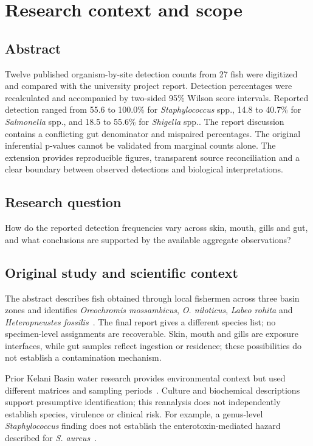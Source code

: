 \documentclass[11pt,a4paper]{article}
\newcommand{\organism}[1]{\textit{#1} spp.}
\newcommand{\sectiontitle}[1]{\section{\color{ink}#1}}
\begin{document}
\sectiontitle{Research context and scope}
\subsection*{Abstract}
Twelve published organism-by-site detection counts from 27 fish were digitized and compared with the university project report. Detection percentages were recalculated and accompanied by two-sided 95\% Wilson score intervals. Reported detection ranged from 55.6 to 100.0\% for \organism{Staphylococcus}, 14.8 to 40.7\% for \organism{Salmonella}, and 18.5 to 55.6\% for \organism{Shigella}. The report discussion contains a conflicting gut denominator and mispaired percentages. The original inferential p-values cannot be validated from marginal counts alone. The extension provides reproducible figures, transparent source reconciliation and a clear boundary between observed detections and biological interpretations.

\subsection*{Research question}
How do the reported detection frequencies vary across skin, mouth, gills and gut, and what conclusions are supported by the available aggregate observations?

\subsection*{Original study and scientific context}
The abstract describes fish obtained through local fishermen across three basin zones and identifies \textit{Oreochromis mossambicus}, \textit{O. niloticus}, \textit{Labeo rohita} and \textit{Heteropneustes fossilis}~\cite{abstract}. The final report gives a different species list; no specimen-level assignments are recoverable. Skin, mouth and gills are exposure interfaces, while gut samples reflect ingestion or residence; these possibilities do not establish a contamination mechanism.

Prior Kelani Basin water research provides environmental context but used different matrices and sampling periods~\cite{kelani}. Culture and biochemical descriptions support presumptive identification; this reanalysis does not independently establish species, virulence or clinical risk. For example, a genus-level \textit{Staphylococcus} finding does not establish the enterotoxin-mediated hazard described for \textit{S. aureus}~\cite{cdc}.
\end{document}
